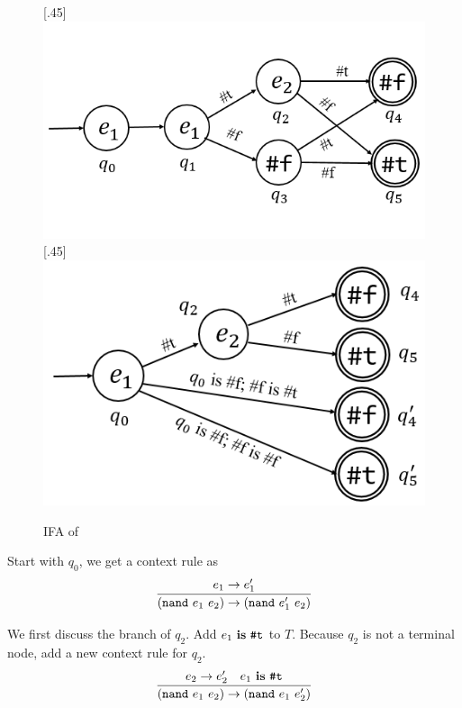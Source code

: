 \begin{figure}[t]
    \centering
    [.45\linewidth]{
        \includegraphics[scale=0.28]{images/ifa/ifa-nand-4.png}
    }
    [.45\linewidth]{
        \includegraphics[scale=0.28]{images/ifa/ifa-nand.png}
    }
    \caption{IFA of }
    \label{fig:ifa-nand-std}
\end{figure}

Start with $q_0$, we get a context rule as
\[
    \infer{(\m{nand}~e_1~e_2) \to (\m{nand}~e_1'~e_2)}{e_1 \to e_1'}
\]

We first discuss the branch of $q_2$. Add $e_1~\mbox{\rm \bf is}~\mbox{\tt \#t}$ to $T$. Because $q_2$ is not a terminal node, add a new context rule for $q_2$.
\[
    \infer{(\m{nand}~e_1~e_2) \to (\m{nand}~e_1~e_2')}{e_2 \to e_2'\quad e_1~\key{is}~\m{\#t}}
\]

